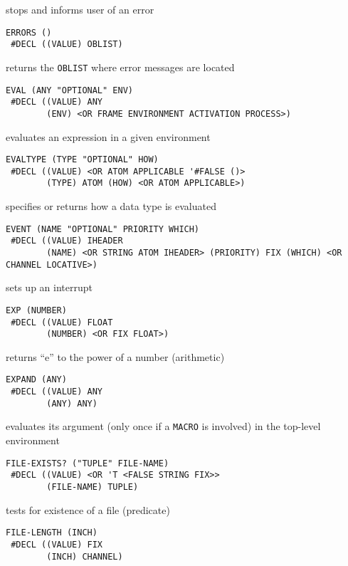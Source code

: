 \documentclass[a4paper]{scrbook}
\begin{document}
stops and informs user of an error

\begin{verbatim}
ERRORS ()
 #DECL ((VALUE) OBLIST)
\end{verbatim}

returns the \texttt{OBLIST} where error messages are located

\begin{verbatim}
EVAL (ANY "OPTIONAL" ENV)
 #DECL ((VALUE) ANY
        (ENV) <OR FRAME ENVIRONMENT ACTIVATION PROCESS>)
\end{verbatim}

evaluates an expression in a given environment

\begin{verbatim}
EVALTYPE (TYPE "OPTIONAL" HOW)
 #DECL ((VALUE) <OR ATOM APPLICABLE '#FALSE ()>
        (TYPE) ATOM (HOW) <OR ATOM APPLICABLE>)
\end{verbatim}

specifies or returns how a data type is evaluated

\begin{verbatim}
EVENT (NAME "OPTIONAL" PRIORITY WHICH)
 #DECL ((VALUE) IHEADER
        (NAME) <OR STRING ATOM IHEADER> (PRIORITY) FIX (WHICH) <OR CHANNEL LOCATIVE>)
\end{verbatim}

sets up an interrupt

\begin{verbatim}
EXP (NUMBER)
 #DECL ((VALUE) FLOAT
        (NUMBER) <OR FIX FLOAT>)
\end{verbatim}

returns ``e'' to the power of a number (arithmetic)

\begin{verbatim}
EXPAND (ANY)
 #DECL ((VALUE) ANY
        (ANY) ANY)
\end{verbatim}

evaluates its argument (only once if a \texttt{MACRO} is involved) in the top-level environment

\begin{verbatim}
FILE-EXISTS? ("TUPLE" FILE-NAME)
 #DECL ((VALUE) <OR 'T <FALSE STRING FIX>>
        (FILE-NAME) TUPLE)
\end{verbatim}

tests for existence of a file (predicate)

\begin{verbatim}
FILE-LENGTH (INCH)
 #DECL ((VALUE) FIX
        (INCH) CHANNEL)
\end{verbatim}
\end{document}
